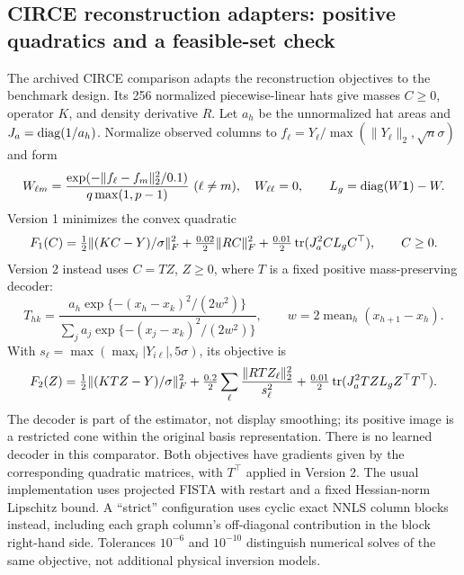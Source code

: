 \subsection{CIRCE reconstruction adapters: positive quadratics and a feasible-set check}\label{app:circe}
The archived CIRCE comparison adapts the reconstruction objectives to the benchmark design. Its 256 normalized piecewise-linear hats give masses $C\geq0$, operator $K$, and density derivative $R$. Let $a_h$ be the unnormalized hat areas and $J_a=\operatorname{diag}(1/a_h)$. Normalize observed columns to $f_\ell=Y_\ell/\max(\|Y_\ell\|_2,\sqrt n\sigma)$ and form
\begin{equation}\label{eq:circegraph}
 W_{\ell m}=\frac{\exp(-\|f_\ell-f_m\|_2^2/0.1)}{q\max(1,p-1)}\ (\ell\ne m),
 \quad W_{\ell\ell}=0,\qquad L_g=\operatorname{diag}(W\mathbf{1})-W.
\end{equation}
Version 1 minimizes the convex quadratic
\begin{equation}\label{eq:circeone}
 F_1(C)=\tfrac12\|(KC-Y)/\sigma\|_F^2
       +\tfrac{0.02}{2}\|RC\|_F^2
       +\tfrac{0.01}{2}\operatorname{tr}(J_a^2 C L_g C^\top),\qquad C\geq0.
\end{equation}
Version 2 instead uses $C=TZ$, $Z\geq0$, where $T$ is a fixed positive mass-preserving decoder:
\begin{equation}\label{eq:circedecoder}
 T_{hk}=\frac{a_h\exp\{-(x_h-x_k)^2/(2w^2)\}}
 {\sum_j a_j\exp\{-(x_j-x_k)^2/(2w^2)\}},\qquad
 w=2\operatorname{mean}_h(x_{h+1}-x_h).
\end{equation}
With $s_\ell=\max(\max_i|Y_{i\ell}|,5\sigma)$, its objective is
\begin{equation}\label{eq:circetwo}
 F_2(Z)=\tfrac12\|(KTZ-Y)/\sigma\|_F^2
       +\tfrac{0.2}{2}\sum_\ell\frac{\|RTZ_\ell\|_2^2}{s_\ell^2}
       +\tfrac{0.01}{2}\operatorname{tr}(J_a^2TZL_gZ^\top T^\top).
\end{equation}
The decoder is part of the estimator, not display smoothing; its positive image is a restricted cone within the original basis representation. There is no learned decoder in this comparator. Both objectives have gradients given by the corresponding quadratic matrices, with $T^\top$ applied in Version 2. The usual implementation uses projected FISTA with restart and a fixed Hessian-norm Lipschitz bound. A ``strict'' configuration uses cyclic exact NNLS column blocks instead, including each graph column's off-diagonal contribution in the block right-hand side. Tolerances $10^{-6}$ and $10^{-10}$ distinguish numerical solves of the same objective, not additional physical inversion models.


